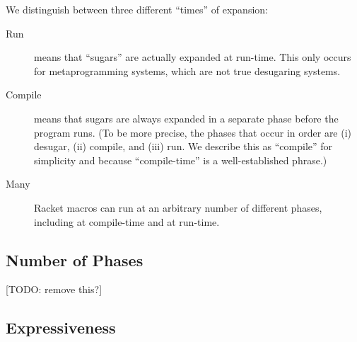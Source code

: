 We distinguish between three different ``times'' of expansion:
\begin{description}
\item[Run] means that ``sugars'' are actually expanded at run-time.
  This only occurs for metaprogramming systems, which are not true
  desugaring systems.
\item[Compile] means that sugars are always expanded in a separate
  phase before the program runs. (To be more precise, the phases that
  occur in order are (i) desugar, (ii) compile, and (iii) run. We
  describe this as ``compile'' for simplicity and because
  ``compile-time'' is a well-established phrase.)
\item[Many] Racket macros can run at an arbitrary number of different
  phases, including at compile-time and at run-time.
\end{description}

\subsection{Number of Phases}

[TODO: remove this?]

\subsection{Expressiveness}

